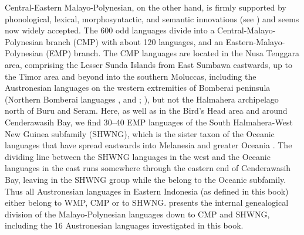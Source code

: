 Central-Eastern Malayo-Polynesian, on the other hand, is firmly supported by phonological, lexical, morphosyntactic, and semantic innovations (see \citealt{blust1993central}) and seems now widely accepted. The 600 odd languages divide into a Central-Malayo-Poly\-ne\-sian branch (CMP) with about 120 languages, and an Eastern-Malayo-Polynesian (EMP) branch. The CMP languages are located in the Nusa Tenggara area, comprising the Lesser Sunda Islands from East Sumbawa eastwards, up to the Timor area and beyond into the southern Moluccas, including the Austronesian languages on the western extremities of Bomberai peninsula (Northern Bomberai languages ,  and ; \citealt[24]{adelaar2005austronesian}), but not the Halmahera archipelago north of Buru and Seram. Here, as well as in the Bird's Head area and around Cenderawasih Bay, we find 30--40 EMP languages of the South Halmahera-West New Guinea subfamily (SHWNG), which is the sister taxon of the Oceanic languages that have spread eastwards into Melanesia and greater Oceania \citep{blust2009austronesian}. The dividing line between the SHWNG languages in the west and the Oceanic languages in the east runs somewhere through the eastern end of Cenderawasih Bay, leaving  in the SHWNG group while the  belong to the Oceanic subfamily. Thus all Austronesian languages in Eastern Indonesia (as defined in this book) either belong to WMP, CMP or to SHWNG.  presents the internal genealogical division of the Malayo-Polynesian languages down to CMP and SHWNG, including the 16 Austronesian languages investigated in this book.

